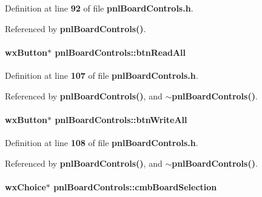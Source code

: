 Definition at line {\bf 92} of file {\bf pnl\+Board\+Controls.\+h}.



Referenced by {\bf pnl\+Board\+Controls()}.

\paragraph[{btn\+Read\+All}]{\setlength{\rightskip}{0pt plus 5cm}wx\+Button$\ast$ pnl\+Board\+Controls\+::btn\+Read\+All\hspace{0.3cm}{\ttfamily [protected]}}\label{classpnlBoardControls_a770efa56a439c85b80cb445fcd2dadae}


Definition at line {\bf 107} of file {\bf pnl\+Board\+Controls.\+h}.



Referenced by {\bf pnl\+Board\+Controls()}, and {\bf $\sim$pnl\+Board\+Controls()}.

\paragraph[{btn\+Write\+All}]{\setlength{\rightskip}{0pt plus 5cm}wx\+Button$\ast$ pnl\+Board\+Controls\+::btn\+Write\+All\hspace{0.3cm}{\ttfamily [protected]}}\label{classpnlBoardControls_a225e62df2feb7970f351e835a89811bb}


Definition at line {\bf 108} of file {\bf pnl\+Board\+Controls.\+h}.



Referenced by {\bf pnl\+Board\+Controls()}, and {\bf $\sim$pnl\+Board\+Controls()}.

\paragraph[{cmb\+Board\+Selection}]{\setlength{\rightskip}{0pt plus 5cm}wx\+Choice$\ast$ pnl\+Board\+Controls\+::cmb\+Board\+Selection\hspace{0.3cm}{\ttfamily [protected]}}\label{classpnlBoardControls_affb505a35fdd93c8d8cfb5fa79da83a7}


